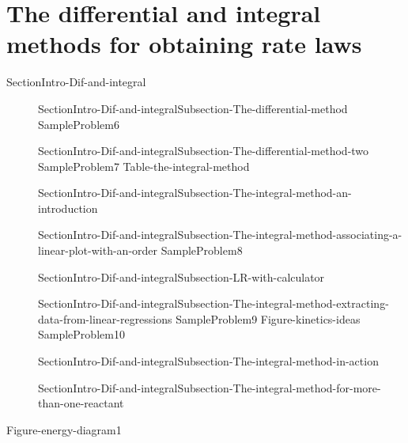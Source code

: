 \documentclass[main.tex]{subfiles}
\newcommand\chapterlabel{Ch-kinetics}\setcounter{figurenewcounter}{0}\setcounter{tablenewcounter}{0}\setcounter{formulanewcounter}{0}\chapterpicture{../{\chapterlabel}/figure1}\chapterpicturelabel{PxFuel}
\begin{document}
\section{The differential and integral methods for obtaining rate laws}{SectionIntro-Dif-and-integral}
\sloppy \begin{description}
\item[] {SectionIntro-Dif-and-integralSubsection-The-differential-method}
  {SampleProblem6}
\item[] {SectionIntro-Dif-and-integralSubsection-The-differential-method-two}
  {SampleProblem7}
  {Table-the-integral-method}
 \item[] {SectionIntro-Dif-and-integralSubsection-The-integral-method-an-introduction}
\item[] {SectionIntro-Dif-and-integralSubsection-The-integral-method-associating-a-linear-plot-with-an-order}
  {SampleProblem8}

\item[] {SectionIntro-Dif-and-integralSubsection-LR-with-calculator}

\item[] {SectionIntro-Dif-and-integralSubsection-The-integral-method-extracting-data-from-linear-regressions}
  {SampleProblem9}
  {Figure-kinetics-ideas}
  {SampleProblem10}
\item[] {SectionIntro-Dif-and-integralSubsection-The-integral-method-in-action}
\item[] {SectionIntro-Dif-and-integralSubsection-The-integral-method-for-more-than-one-reactant}
\end{description}
  {Figure-energy-diagram1}
\end{document}
